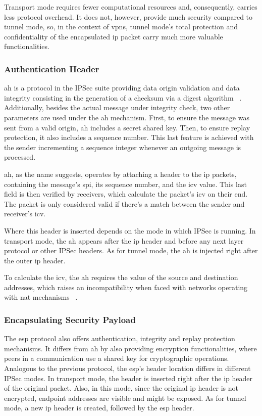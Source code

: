 \documentclass[11pt,twoside,a4paper]{report}
\begin{document}
Transport mode requires fewer computational resources and, consequently, carries less protocol overhead. It does not, however, provide much security compared to tunnel mode, so, in the context of \ac{vpn}s, tunnel mode's total protection and confidentiality of the encapsulated \ac{ip} packet carry much more valuable functionalities.

\subsubsection{Authentication Header}

\ac{ah} is a protocol in the IPSec suite providing data origin validation and data integrity consisting in the generation of a checksum via a digest algorithm ~\cite{rfc4302}. Additionally, besides the actual message under integrity check, two other parameters are used under the \ac{ah} mechanism. First, to ensure the message was sent from a valid origin, \ac{ah} includes a secret shared key. Then, to ensure replay protection, it also includes a sequence number. This last feature is achieved with the sender incrementing a sequence integer whenever an outgoing message is processed.

\ac{ah}, as the name suggests, operates by attaching a header to the \ac{ip} packets, containing the message's \ac{spi}, its sequence number, and the \ac{icv} value. This last field is then verified by receivers, which calculate the packet's \ac{icv} on their end. The packet is only considered valid if there's a match between the sender and receiver's \ac{icv}.

Where this header is inserted depends on the mode in which IPSec is running. In transport mode, the \ac{ah} appears after the \ac{ip} header and before any next layer protocol or other IPSec headers. As for tunnel mode, the \ac{ah} is injected right after the outer \ac{ip} header.

To calculate the \ac{icv}, the \ac{ah} requires the value of the source and destination addresses, which raises an incompatibility when faced with networks operating with \ac{nat} mechanisms ~\cite{frankel2005guide}.

\subsubsection{Encapsulating Security Payload}

The \ac{esp} protocol also offers authentication, integrity and replay protection mechanisms. It differs from \ac{ah} by also providing encryption functionalities, where peers in a communication use a shared key for cryptographic operations. Analogous to the previous protocol, the \ac{esp}'s header location differs in different IPSec modes. In transport mode, the header is inserted right after the \ac{ip} header of the original packet. Also, in this mode, since the original \ac{ip} header is not encrypted, endpoint addresses are visible and might be exposed. As for tunnel mode, a new \ac{ip} header is created, followed by the \ac{esp} header.
\end{document}
